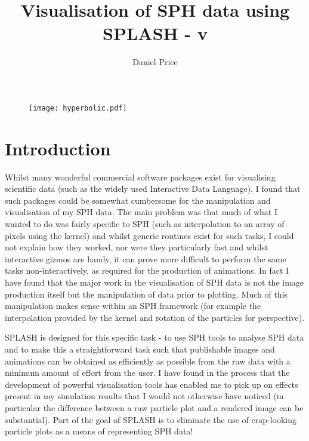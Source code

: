 \documentclass[a4paper,11pt]{article}
\title{Visualisation of SPH data using SPLASH - v}
\author{Daniel Price}
\begin{document}
\begin{figure}
\begin{center}
\texttt{[image: hyperbolic.pdf]}
\end{center}
\end{figure}
\maketitle
\tableofcontents
\newpage

\section{Introduction}
 Whilst many wonderful commercial software packages exist for visualising scientific
data (such as the widely used Interactive Data Language), I found that such packages
could be somewhat cumbersome for the manipulation and visualisation of my SPH data. The
main problem was that much of what I wanted to do was fairly specific to SPH (such as
interpolation to an array of pixels using the kernel) and whilst generic routines exist
for such tasks, I could not explain how they worked, nor were they
particularly fast and whilst interactive gizmos are handy, it can prove more difficult to perform the
same tasks non-interactively, as required for the production of animations. 
In fact I have found that the major
work in the visualisation of SPH data is not the image production itself but the
manipulation of data prior to plotting. Much of this manipulation makes sense
within an SPH framework (for example the interpolation provided by the kernel
and rotation of the particles for perspective).

 SPLASH is designed for this specific task - to use SPH tools to analyse SPH data and to make this a
straightforward task such that publishable images and animations can be obtained
as efficiently as possible from the raw data with a minimum amount of effort
from the user. I have found in the process that the development of powerful
visualisation tools has enabled me to pick up on effects present in my
simulation results that I would not otherwise have noticed (in particular the
difference between a raw particle plot and a rendered image can be substantial). Part of the goal of
SPLASH is to eliminate the use of crap-looking particle plots as a means of representing SPH data!
\end{document}
